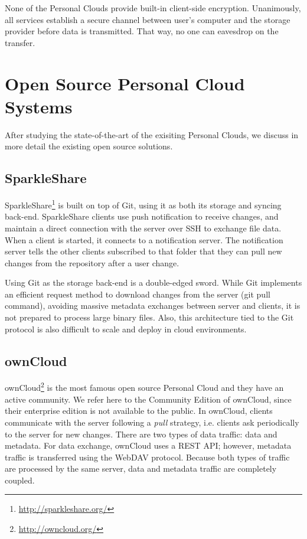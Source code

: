 None of the Personal Clouds provide built-in client-side encryption. Unanimously, all services establish a secure channel between user's computer and the storage provider before data is transmitted. That way, no one can eavesdrop on the transfer.

\section{Open Source Personal Cloud Systems}

After studying the state-of-the-art of the exisiting Personal Clouds, we discuss in more detail
the existing open source solutions.

\subsection{SparkleShare}

SparkleShare\footnote{\url{http://sparkleshare.org/}} is built on top of Git, using it 
as both its storage and syncing back-end. SparkleShare clients use push notification
to receive changes, and maintain a direct connection with the server over SSH to exchange file data.
When a client is started, it connects to a notification server. The notification server tells the other
clients subscribed to that folder that they can pull new changes from the repository after a user
change. 

Using Git as the storage back-end is a double-edged sword. While Git implements an efficient request
method to download changes from the server (git pull command), avoiding massive metadata exchanges
between server and clients, it is not prepared to process large binary files. Also, this architecture
tied to the Git protocol is also difficult to scale and deploy in cloud environments.

\subsection{ownCloud}
ownCloud\footnote{\url{http://owncloud.org/}} is the most famous open source  Personal Cloud 
and they have an active community. We refer here to the Community Edition of ownCloud, since their enterprise edition is not available to the public. In ownCloud, clients communicate with the server following a \textit{pull} strategy, i.e. clients ask periodically to the server for new changes. There are two types of data traffic: data and metadata. For data exchange, ownCloud uses a REST API; however, metadata traffic is transferred using the WebDAV protocol. 
Because both types of traffic are processed by the same server, data and metadata traffic are completely coupled.

